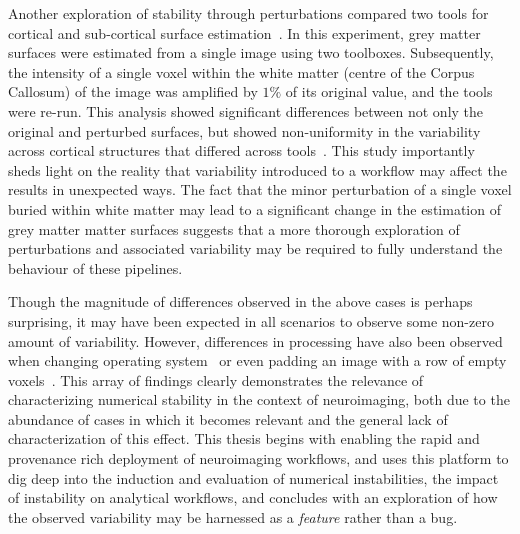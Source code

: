 Another exploration of stability through perturbations compared two tools for cortical and sub-cortical surface
estimation~\cite{Lewis2017-ll}. In this experiment, grey matter surfaces were estimated from a single image using two
toolboxes. Subsequently, the intensity of a single voxel within the white matter (centre of the Corpus Callosum) of the
image was amplified by $1\%$ of its original value, and the tools were re-run. This analysis showed significant
differences between not only the original and perturbed surfaces, but showed non-uniformity in the variability across
cortical structures that differed across tools~\cite{Lewis2017-ll}. This study importantly sheds light on the reality
that variability introduced to a workflow may affect the results in unexpected ways. The fact that the minor
perturbation of a single voxel buried within white matter may lead to a significant change in the estimation of grey
matter matter surfaces suggests that a more thorough exploration of perturbations and associated variability may be
required to fully understand the behaviour of these pipelines.

Though the magnitude of differences observed in the above cases is perhaps surprising, it may have been expected in all
scenarios to observe some non-zero amount of variability. However, differences in processing have also been observed
when changing operating system~\cite{Glatard2015-vc,salari2020file} or even padding an image with a row of empty
voxels~\cite{Glen2018-sg}. This array of findings clearly demonstrates the relevance of characterizing numerical
stability in the context of neuroimaging, both due to the abundance of cases in which it becomes relevant and the
general lack of characterization of this effect. This thesis begins with enabling the rapid and provenance rich
deployment of neuroimaging workflows, and uses this platform to dig deep into the induction and evaluation of
numerical instabilities, the impact of instability on analytical workflows, and concludes with an exploration of how
the observed variability may be harnessed as a \textit{feature} rather than a bug.

